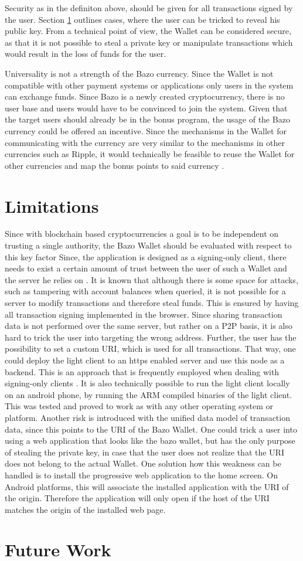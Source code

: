 Security as in the definiton above, should be given for all transactions signed by the user. Section \ref{limitations} outlines cases, where the user can be tricked to reveal his public key. From a technical point of view, the Wallet can be considered secure, as that it is not possible to steal a private key or manipulate transactions which would result in the loss of funds for the user.

Universality is not a strength of the Bazo currency. Since the Wallet is not compatible with other payment systems or applications only users in the system can exchange funds. Since Bazo is a newly created cryptocurrency, there is no user base and users would have to be convinced to join the system. Given that the target users should already be in the bonus program, the usage of the Bazo currency could be offered an incentive. Since the mechanisms in the Wallet for communicating with the currency are very similar to the mechanisms in other currencies such as Ripple, it would technically be feasible to reuse the Wallet for other currencies and map the bonus points to said currency \cite{ripplelib}.

\section{Limitations}\label{limitations}
Since with blockchain based cryptocurrencies a goal is to be independent on trusting a single authority, the Bazo Wallet should be evaluated with respect to this key factor
Since, the application is designed as a signing-only client, there needs to exist a certain amount of trust between the user of such a Wallet and the server he relies on \cite{bitcoinclients}.
It is known that although there is some space for attacks, such as tampering with account balances when queried, it is not possible for a server to modify transactions and therefore steal funds. This is ensured by having all transaction signing implemented in the browser. Since sharing transaction data is not performed over the same server, but rather on a P2P basis, it is also hard to trick the user into targeting the wrong address. Further, the user has the possibility to set a custom URI, which is used for all transactions. That way, one could deploy the light client to an https enabled server and use this node as a backend. This is an approach that is frequently employed when dealing with signing-only clients \cite{bitcoinclients}. It is also technically possible to run the light client locally on an android phone, by running the ARM compiled binaries of the light client. This was tested and proved to work as with any other operating system or platform.
Another risk is introduced with the unified data model of transaction data, since this points to the URI of the Bazo Wallet. One could trick a user into using a web application that looks like the bazo wallet, but has the only purpose of stealing the private key, in case that the user does not realize that the URI does not belong to the actual Wallet.
One solution how this weakness can be handled is to install the progressive web application to the home screen. On Android platforms, this will associate the installed application with the URI of the origin. Therefore the application will only open if the host of the URI matches the origin of the installed web page.
\section{Future Work}